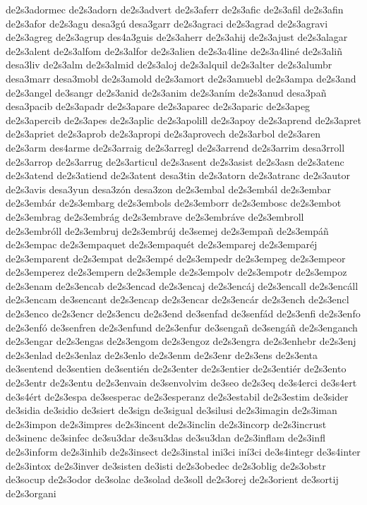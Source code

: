 {de2s3adormec
de2s3adorn
de2s3advert
de2s3aferr
de2s3afic
de2s3afil
de2s3afin
de2s3afor
de2s3agu
desa3gú
desa3garr
de2s3agraci
de2s3agrad
de2s3agravi
de2s3agreg
de2s3agrup
des4a3guis
de2s3aherr
de2s3ahij
de2s3ajust
de2s3alagar
de2s3alent
de2s3alfom
de2s3alfor
de2s3alien
de2s3a4line
de2s3a4liné
de2s3aliñ
desa3liv
de2s3alm
de2s3almid
de2s3aloj
de2s3alquil
de2s3alter
de2s3alumbr
desa3marr
desa3mobl
de2s3amold
de2s3amort
de2s3amuebl
de2s3ampa
de2s3and
de2s3angel
de3sangr
de2s3anid
de2s3anim
de2s3aním
de2s3anud
desa3pañ
desa3pacib
de2s3apadr
de2s3apare
de2s3aparec
de2s3aparic
de2s3apeg
de2s3apercib
de2s3apes
de2s3aplic
de2s3apolill
de2s3apoy
de2s3aprend
de2s3apret
de2s3apriet
de2s3aprob
de2s3apropi
de2s3aprovech
de2s3arbol
de2s3aren
de2s3arm
des4arme
de2s3arraig
de2s3arregl
de2s3arrend
de2s3arrim
desa3rroll
de2s3arrop
de2s3arrug
de2s3articul
de2s3asent
de2s3asist
de2s3asn
de2s3atenc
de2s3atend
de2s3atiend
de2s3atent
desa3tin
de2s3atorn
de2s3atranc
de2s3autor
de2s3avis
desa3yun
desa3zón
desa3zon
de2s3embal
de2s3embál
de2s3embar
de2s3embár
de2s3embarg
de2s3embols
de2s3emborr
de2s3embosc
de2s3embot
de2s3embrag
de2s3embrág
de2s3embrave
de2s3embráve
de2s3embroll
de2s3embróll
de2s3embruj
de2s3embrúj
de3semej
de2s3empañ
de2s3empáñ
de2s3empac
de2s3empaquet
de2s3empaquét
de2s3emparej
de2s3emparéj
de2s3emparent
de2s3empat
de2s3empé
de2s3empedr
de2s3empeg
de2s3empeor
de2s3emperez
de2s3empern
de2s3emple
de2s3empolv
de2s3empotr
de2s3empoz
de2s3enam
de2s3encab
de2s3encad
de2s3encaj
de2s3encáj
de2s3encall
de2s3encáll
de2s3encam
de3sencant
de2s3encap
de2s3encar
de2s3encár
de2s3ench
de2s3encl
de2s3enco
de2s3encr
de2s3encu
de2s3end
de3senfad
de3senfád
de2s3enfi
de2s3enfo
de2s3enfó
de3senfren
de2s3enfund
de2s3enfur
de3sengañ
de3sengáñ
de2s3enganch
de2s3engar
de2s3engas
de2s3engom
de2s3engoz
de2s3engra
de2s3enhebr
de2s3enj
de2s3enlad
de2s3enlaz
de2s3enlo
de2s3enm
de2s3enr
de2s3ens
de2s3enta
de3sentend
de3sentien
de3sentién
de2s3enter
de2s3entier
de2s3entiér
de2s3ento
de2s3entr
de2s3entu
de2s3envain
de3senvolvim
de3seo
de2s3eq
de3s4erci
de3s4ert
de3s4ért
de2s3espa
de3sesperac
de2s3esperanz
de2s3estabil
de2s3estim
de3sider
de3sidia
de3sidio
de3siert
de3sign
de3sigual
de3silusi
de2s3imagin
de2s3iman
de2s3impon
de2s3impres
de2s3incent
de2s3inclin
de2s3incorp
de2s3incrust
de3sinenc
de3sinfec
de3su3dar
de3su3das
de3su3dan
de2s3inflam
de2s3infl
de2s3inform
de2s3inhib
de2s3insect
de2s3instal
ini3ci
iní3ci
de3s4integr
de3s4inter
de2s3intox
de2s3inver
de3sisten
de3isti
de2s3obedec
de2s3oblig
de2s3obstr
de3socup
de2s3odor
de3solac
de3solad
de3soll
de2s3orej
de2s3orient
de3sortij
de2s3organi
}
